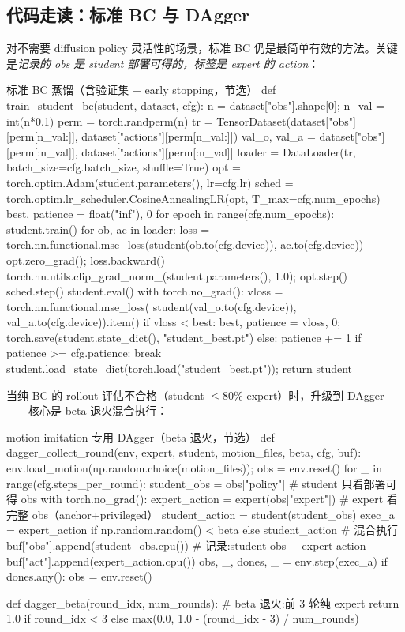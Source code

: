 \subsection{代码走读：标准 BC 与 DAgger}
\label{sec:rlmc-imit-bc-code}

对不需要 diffusion policy 灵活性的场景，标准 BC 仍是最简单有效的方法。关键是\emph{记录的 obs 是 student 部署可得的，标签是 expert 的 action}：

\begin{codebox}[Python]{标准 BC 蒸馏（含验证集 + early stopping，节选）}
def train_student_bc(student, dataset, cfg):
    n = dataset["obs"].shape[0]; n_val = int(n*0.1)
    perm = torch.randperm(n)
    tr = TensorDataset(dataset["obs"][perm[n_val:]], dataset["actions"][perm[n_val:]])
    val_o, val_a = dataset["obs"][perm[:n_val]], dataset["actions"][perm[:n_val]]
    loader = DataLoader(tr, batch_size=cfg.batch_size, shuffle=True)
    opt = torch.optim.Adam(student.parameters(), lr=cfg.lr)
    sched = torch.optim.lr_scheduler.CosineAnnealingLR(opt, T_max=cfg.num_epochs)
    best, patience = float("inf"), 0
    for epoch in range(cfg.num_epochs):
        student.train()
        for ob, ac in loader:
            loss = torch.nn.functional.mse_loss(student(ob.to(cfg.device)),
                                                ac.to(cfg.device))
            opt.zero_grad(); loss.backward()
            torch.nn.utils.clip_grad_norm_(student.parameters(), 1.0); opt.step()
        sched.step()
        student.eval()
        with torch.no_grad():
            vloss = torch.nn.functional.mse_loss(
                student(val_o.to(cfg.device)), val_a.to(cfg.device)).item()
        if vloss < best:
            best, patience = vloss, 0; torch.save(student.state_dict(), "student_best.pt")
        else:
            patience += 1
        if patience >= cfg.patience:
            break
    student.load_state_dict(torch.load("student_best.pt")); return student
\end{codebox}

当纯 BC 的 rollout 评估不合格（student $\le 80\%$ expert）时，升级到 DAgger——核心是 beta 退火混合执行：

\begin{codebox}[Python]{motion imitation 专用 DAgger（beta 退火，节选）}
def dagger_collect_round(env, expert, student, motion_files, beta, cfg, buf):
    env.load_motion(np.random.choice(motion_files)); obs = env.reset()
    for _ in range(cfg.steps_per_round):
        student_obs = obs["policy"]                 # student 只看部署可得 obs
        with torch.no_grad():
            expert_action = expert(obs["expert"])   # expert 看完整 obs（anchor+privileged）
            student_action = student(student_obs)
        exec_a = expert_action if np.random.random() < beta else student_action  # 混合执行
        buf["obs"].append(student_obs.cpu())        # 记录:student obs + expert action
        buf["act"].append(expert_action.cpu())
        obs, _, dones, _ = env.step(exec_a)
        if dones.any(): obs = env.reset()

def dagger_beta(round_idx, num_rounds):             # beta 退火:前 3 轮纯 expert
    return 1.0 if round_idx < 3 else max(0.0, 1.0 - (round_idx - 3) / num_rounds)
\end{codebox}

